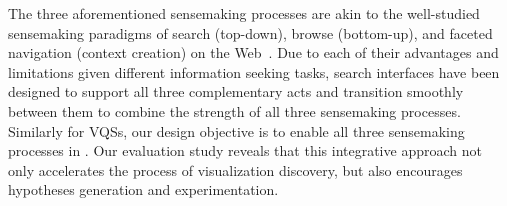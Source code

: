    \par The three aforementioned sensemaking processes are akin to the well-studied sensemaking paradigms of search (top-down), browse (bottom-up), and faceted navigation (context creation) on the Web~\cite{Hearst2009,Olston2003}. Due to each of their advantages and limitations given different information seeking tasks, search interfaces have been designed to support all three complementary acts and transition smoothly between them to combine the strength of all three sensemaking processes. Similarly for VQSs, our design objective is to enable all three sensemaking processes in \zvpp. Our  evaluation study reveals that this integrative approach not only accelerates the process of visualization discovery, but also encourages hypotheses generation and experimentation.